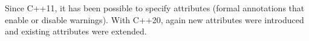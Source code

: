 
Since C++11, it has been possible to specify attributes (formal annotations that enable or disable warnings). With C++20, again new attributes were introduced and existing attributes were extended.



